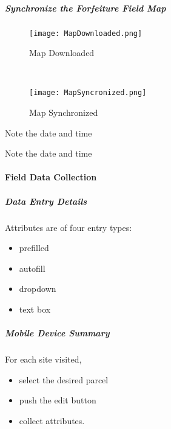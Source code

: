 {\LARGE\noindent{}  \lookArrow}
\vspace{2in}

{\LARGE\noindent{} \lookArrow}



\clearpage


\subparagraph{Synchronize the Forfeiture Field Map}

\begin{wrapfigure}{r}{0.5\textwidth}
\centering
    \texttt{[image: MapDownloaded.png]}
\caption{Map Downloaded}
\vspace{.25in}

\HRule \\[.4cm] %
\vspace{.25in}

    \texttt{[image: MapSyncronized.png]}
\caption{Map Synchronized}
\end{wrapfigure}
Note the date and time
\vspace{1in}

\vspace{3in}

\noindent Note the date and time
\vspace{1in}

\clearpage

\paragraph{Field Data Collection}
\subparagraph{Data Entry Details}

Attributes are of four entry types:
\begin{itemize}
\item prefilled
\item autofill
\item dropdown
\item text box
\end{itemize}

\subparagraph{Mobile Device Summary}

For each site visited,

\begin{itemize}
\item select the desired parcel
\item push the edit button
\item collect attributes.
\end{itemize}

